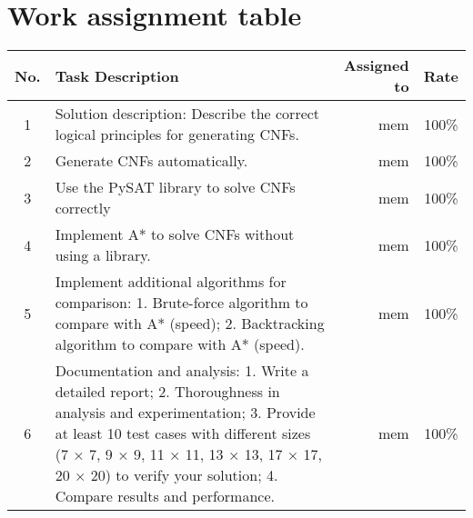 \section{Work assignment table}
\begin{center}
  \renewcommand{\arraystretch}{1.5}
  \begin{tabular}{|c|p{}|r|c|}
    \hline
    \textbf{No.} & \textbf{Task Description}                                                                                                                                                                                                                                                       & \textbf{Assigned to} & \textbf{Rate} \\\hline
    1            & Solution description: Describe the correct logical principles for generating CNFs.                                                                                                                                                                                              & mem                  & 100\%         \\\hline
    2            & Generate CNFs automatically.                                                                                                                                                                                                                                                    & mem                  & 100\%         \\\hline
    3            & Use the PySAT library to solve CNFs correctly                                                                                                                                                                                                                                   & mem                  & 100\%         \\\hline
    4            & Implement A* to solve CNFs without using a library.                                                                                                                                                                                                                             & mem                  & 100\%         \\\hline
    5            & Implement additional algorithms for comparison: 1. Brute-force algorithm to compare with A* (speed); 2. Backtracking algorithm to compare with A* (speed).                                                                                                                      & mem                  & 100\%         \\\hline
    6            & Documentation and analysis: 1. Write a detailed report; 2. Thoroughness in analysis and experimentation; 3. Provide at least 10 test cases with different sizes (7 × 7, 9 × 9, 11 × 11, 13 × 13, 17 × 17, 20 × 20) to verify your solution; 4. Compare results and performance. & mem                  & 100\%         \\\hline
  \end{tabular}
\end{center}
